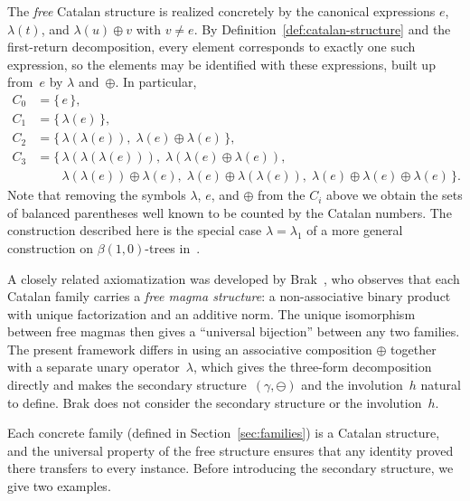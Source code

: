 \documentclass[a4paper,11pt]{article}
\theoremstyle{definition}
\begin{document}
The \emph{free} Catalan structure is realized concretely by the canonical
expressions $e$, $\lambda(t)$, and $\lambda(u) \oplus v$ with $v \neq e$. By
Definition~\ref{def:catalan-structure} and the first-return decomposition, every
element corresponds to exactly one such expression, so the elements may be
identified with these expressions, built up from~$e$ by $\lambda$ and~$\oplus$.
In particular,
\begin{align*}
  C_0 &= \bigl\{\,e\,\bigr\}, \\
  C_1 &= \bigl\{\,\lambda(e)\,\bigr\}, \\
  C_2 &= \bigl\{\,\lambda(\lambda(e)),\; \lambda(e)\oplus\lambda(e)\,\bigr\}, \\
  C_3 &= \bigl\{\,\lambda(\lambda(\lambda(e))),\;
           \lambda(\lambda(e)\oplus\lambda(e)),\; \\
       &\qquad  \lambda(\lambda(e))\oplus\lambda(e),\;
         \lambda(e)\oplus\lambda(\lambda(e)),\;
           \lambda(e)\oplus\lambda(e)\oplus\lambda(e)\,\bigr\}.
\end{align*}
Note that removing the symbols $\lambda$, $e$, and $\oplus$ from the $C_i$ above
we obtain the sets of balanced parentheses well known to be counted by the
Catalan numbers.  The construction described here is the special case
$\lambda = \lambda_1$ of a more general construction on $\beta(1,0)$-trees
in~\cite{CKS09}.

A closely related axiomatization was developed by Brak~\cite{Brak19}, who
observes that each Catalan family carries a \emph{free magma structure}: a
non-associative binary product with unique factorization and an additive
norm. The unique isomorphism between free magmas then gives a ``universal
bijection'' between any two families.  The present framework differs in using an
associative composition $\oplus$ together with a separate unary
operator~$\lambda$, which gives the three-form decomposition directly and makes
the secondary structure~$(\gamma, \ominus)$ and the involution~$h$ natural to
define. Brak does not consider the secondary structure or the involution~$h$.

Each concrete family (defined in Section~\ref{sec:families}) is a Catalan structure,
and the universal property of the free structure ensures that any identity
proved there transfers to every instance. Before introducing the secondary
structure, we give two examples.
\end{document}
